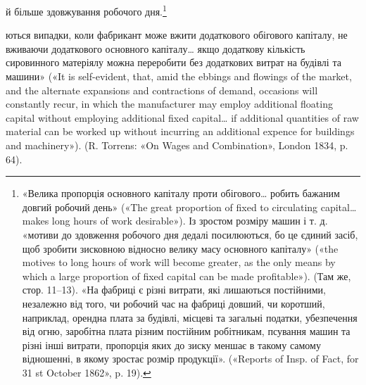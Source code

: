 й більше здовжування робочого дня.\footnote{
«Велика пропорція основного капіталу проти обігового\dots{} робить
бажаним довгий робочий день» («The great proportion of fixed to circulating
capital\dots{} makes long hours of work desirable»). Із зростом розміру
машин і т. д. «мотиви до здовження робочого дня дедалі посилюються,
бо це єдиний засіб, щоб зробити зисковною відносно велику масу основного
капіталу» («the motives to long hours of work will become greater,
as the only means by which a large proportion of fixed capital can be
made profitable»). (Там же, стор. 11--13). «На фабриці є різні витрати,
які лишаються постійними, незалежно від того, чи робочий час на
фабриці довший, чи коротший, наприклад, орендна плата за будівлі, місцеві
та загальні податки, убезпечення від огню, заробітна плата різним
постійним робітникам, псування машин та різні інші витрати, пропорція
яких до зиску меншає в такому самому відношенні, в якому
зростає розмір продукції». («Reports of Insp. of Fact, for 31 st October
1862», p. 19).
}

ються випадки, коли фабрикант може вжити додаткового обігового капіталу,
не вживаючи додаткового основного капіталу\dots{} якщо додаткову
кількість сировинного матеріялу можна переробити без додаткових витрат
на будівлі та машини» («It is self-evident, that, amid the ebbings and
flowings of the market, and the alternate expansions and contractions of
demand, occasions will constantly recur, in which the manufacturer may
employ additional floating capital without employing additional fixed
capital\dots{} if additional quantities of raw material can be worked up without
incurring an additional expence for buildings and machinery»).
(R. Torrens: «On Wages and Combination», London 1834, p. 64).

